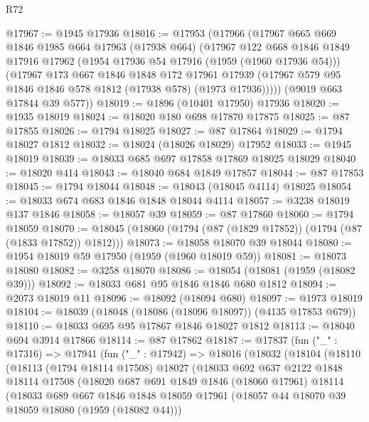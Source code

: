\begin{lexlean}{R72}
\begin{coremodule}
@17967 := @1945 @17936
@18016 := @17953
    (@17966
      (@17967
        @665
        @669
        @1846
        @1985
        @664
        @17963
        (@17938 @664)
        (@17967
          @122
          @668
          @1846
          @1849
          @17916
          @17962
          (@1954 @17936 @54 @17916 (@1959 (@1960 @17936 @54)))
          (@17967
            @173
            @667
            @1846
            @1848
            @172
            @17961
            @17939
            (@17967 @579 @95 @1846 @1846 @578 @1812 (@17938 @578) (@1973 @17936)))))
      (@9019 @663 @17844 @39 @577))
@18019 := @1896 (@10401 @17950) @17936
@18020 := @1935 @18019
@18024 := @18020 @180 @698 @17870 @17875
@18025 := @87 @17855
@18026 := @1794 @18025
@18027 := @87 @17864
@18029 := @1794 @18027 @1812
@18032 := @18024 (@18026 @18029) @17952
@18033 := @1945 @18019
@18039 := @18033 @685 @697 @17858 @17869 @18025 @18029
@18040 := @18020 @414
@18043 := @18040 @684 @1849 @17857
@18044 := @87 @17853
@18045 := @1794 @18044
@18048 := @18043 (@18045 @4114) @18025
@18054 := @18033 @674 @683 @1846 @1848 @18044 @4114
@18057 := @3238 @18019 @137 @1846
@18058 := @18057 @39
@18059 := @87 @17860
@18060 := @1794 @18059
@18070 := @18045 (@18060 (@1794 (@87 (@1829 @17852)) (@1794 (@87 (@1833 @17852)) @1812)))
@18073 := @18058 @18070 @39 @18044
@18080 := @1954 @18019 @59 @17950 (@1959 (@1960 @18019 @59))
@18081 := @18073 @18080
@18082 := @3258 @18070
@18086 := @18054 (@18081 (@1959 (@18082 @39)))
@18092 := @18033 @681 @95 @1846 @1846 @680 @1812
@18094 := @2073 @18019 @11
@18096 := @18092 (@18094 @680)
@18097 := @1973 @18019
@18104 := @18039 (@18048 (@18086 (@18096 @18097)) (@4135 @17853 @679))
@18110 := @18033 @695 @95 @17867 @1846 @18027 @1812
@18113 := @18040 @694 @3914 @17866
@18114 := @87 @17862
@18187 := @17837
    (fun ("_" : @17316) =>
    @17941
      (fun ("_" : @17942) =>
      @18016
        (@18032
          (@18104
            (@18110
              (@18113
                (@1794 @18114 @17508)
                @18027
                (@18033
                  @692
                  @637
                  @2122
                  @1848
                  @18114
                  @17508
                  (@18020
                    @687
                    @691
                    @1849
                    @1846
                    (@18060 @17961)
                    @18114
                    (@18033
                      @689
                      @667
                      @1846
                      @1848
                      @18059
                      @17961
                      (@18057 @44 @18070 @39 @18059 @18080 (@1959 (@18082 @44)))

\end{coremodule}
\end{lexlean}
